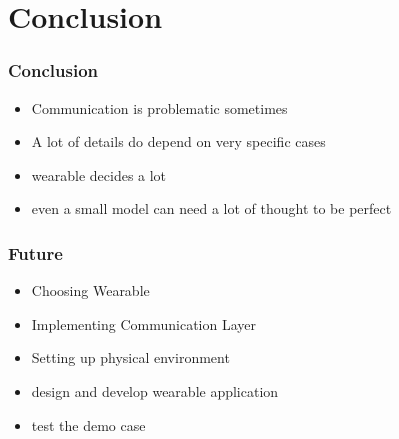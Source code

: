 \section{Conclusion}
\begin{frame}\frametitle{Conclusion}
	\begin{itemize}
		\item Communication is problematic sometimes
		\item A lot of details do depend on very specific cases
		\item wearable decides a lot
		\item even a small model can need a lot of thought to be perfect
	\end{itemize}
\end{frame}
\begin{frame}\frametitle{Future}
	\begin{itemize}
		\item Choosing Wearable
		\item Implementing Communication Layer
		\item Setting up physical environment
		\item design and develop wearable application
		\item test the demo case
	\end{itemize}
\end{frame}